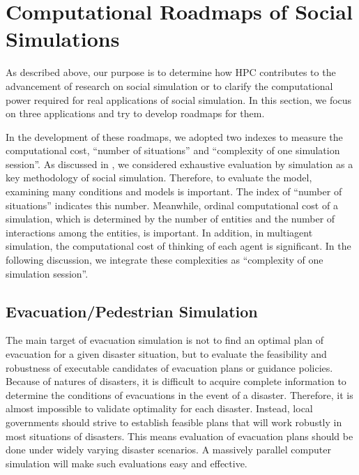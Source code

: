 \section{Computational Roadmaps of Social Simulations}
\label{sec:Computational Roadmaps of Social Simulations}

As described above,
our purpose is to determine how HPC contributes
to the advancement of research on social simulation or
to clarify the computational power required
for real applications of social simulation.
In this section, we focus on three applications and try
to develop roadmaps for them.

In the development of these roadmaps, 
we adopted two indexes to measure the computational cost,
``number of situations'' and ``complexity of one simulation session''.
As discussed in ,
we considered exhaustive evaluation by simulation as 
a key methodology of social simulation.
Therefore, to evaluate the model,
examining many conditions and models is important.
The index of ``number of situations'' indicates this number.
Meanwhile,
ordinal computational cost of a simulation,
which is determined by the number of entities and the number
of interactions among the entities,
is important.
In addition, in multiagent simulation,
the computational cost of thinking of each agent is significant.
In the following discussion, we integrate these complexities
as ``complexity of one simulation session''.

\subsection{Evacuation/Pedestrian Simulation}

The main target of evacuation simulation is not
to find an optimal plan of evacuation for a given disaster situation,
but to evaluate the feasibility and robustness of executable candidates
of evacuation plans or guidance policies.
Because of natures of disasters, it is difficult to acquire complete information
to determine the conditions of evacuations in the event of a disaster.
Therefore, it is almost impossible to validate optimality for
each disaster.
Instead, local governments should strive to establish feasible plans
that will work robustly in most situations of disasters.
This means evaluation of evacuation plans should be done
under widely varying disaster scenarios.
A massively parallel computer simulation 
will make such evaluations easy and effective.

